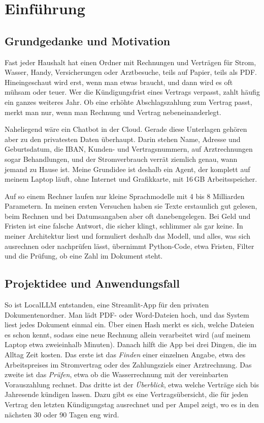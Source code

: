 
\chapter{Einführung}
\label{chap:einfuehrung}

\section{Grundgedanke und Motivation}
\label{sec:motivation}

Fast jeder Haushalt hat einen Ordner mit Rechnungen und Verträgen für Strom, Wasser, Handy, Versicherungen oder Arztbesuche, teils auf Papier, teils als PDF. Hineingeschaut wird erst, wenn man etwas braucht, und dann wird es oft mühsam oder teuer. Wer die Kündigungsfrist eines Vertrags verpasst, zahlt häufig ein ganzes weiteres Jahr. Ob eine erhöhte Abschlagszahlung zum Vertrag passt, merkt man nur, wenn man Rechnung und Vertrag nebeneinanderlegt.

Naheliegend wäre ein Chatbot in der Cloud. Gerade diese Unterlagen gehören aber zu den privatesten Daten überhaupt. Darin stehen Name, Adresse und Geburtsdatum, die IBAN, Kunden- und Vertragsnummern, auf Arztrechnungen sogar Behandlungen, und der Stromverbrauch verrät ziemlich genau, wann jemand zu Hause ist. Meine Grundidee ist deshalb ein Agent, der komplett auf meinem Laptop läuft, ohne Internet und Grafikkarte, mit 16\,GB Arbeitsspeicher.

Auf so einem Rechner laufen nur kleine Sprachmodelle mit 4 bis 8 Milliarden Parametern. In meinen ersten Versuchen haben sie Texte erstaunlich gut gelesen, beim Rechnen und bei Datumsangaben aber oft danebengelegen. Bei Geld und Fristen ist eine falsche Antwort, die sicher klingt, schlimmer als gar keine. In meiner Architektur liest und formuliert deshalb das Modell, und alles, was sich ausrechnen oder nachprüfen lässt, übernimmt Python-Code, etwa Fristen, Filter und die Prüfung, ob eine Zahl im Dokument steht.

\section{Projektidee und Anwendungsfall}
\label{sec:usecase}

So ist LocalLLM entstanden, eine Streamlit-App für den privaten Dokumentenordner. Man lädt PDF- oder Word-Dateien hoch, und das System liest jedes Dokument einmal ein. Über einen Hash merkt es sich, welche Dateien es schon kennt, sodass eine neue Rechnung allein verarbeitet wird (auf meinem Laptop etwa zweieinhalb Minuten). Danach hilft die App bei drei Dingen, die im Alltag Zeit kosten. Das erste ist das \emph{Finden} einer einzelnen Angabe, etwa des Arbeitspreises im Stromvertrag oder des Zahlungsziels einer Arztrechnung. Das zweite ist das \emph{Prüfen}, etwa ob die Wasserrechnung mit der vereinbarten Vorauszahlung rechnet. Das dritte ist der \emph{Überblick}, etwa welche Verträge sich bis Jahresende kündigen lassen. Dazu gibt es eine Vertragsübersicht, die für jeden Vertrag den letzten Kündigungstag ausrechnet und per Ampel zeigt, wo es in den nächsten 30 oder 90 Tagen eng wird.

